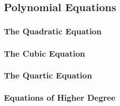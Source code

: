 \subsection{Polynomial Equations}

\subsubsection{The Quadratic Equation}

\subsubsection{The Cubic Equation}

\subsubsection{The Quartic Equation}


\subsubsection{Equations of Higher Degree}






\begin{comment}

ToDo:

-introduce positional number systems, in particular decimal and maybe binary as alternative
-give algorithms for long addition, subtraction, multiplication, division
-maybe also for numbers in scientific notation, i.e. floating point numbers
-introduce sum and product notation
 -maybe with a spoiler to infinite sums, use $\sum_{k=1}^{\infty} (1/10)^k = 0.1111... = 1/9$ as example
-introduce sums, products, factorials and binomial coefficients
-but maybe that stuff should go into the "Elementary Algebra" section because it involves 
 variables

References:

https://en.wikipedia.org/wiki/Arithmetic
https://www.britannica.com/science/arithmetic
https://en.wikipedia.org/wiki/Positional_notation
https://en.wikipedia.org/wiki/Mixed_radix


\end{comment}


